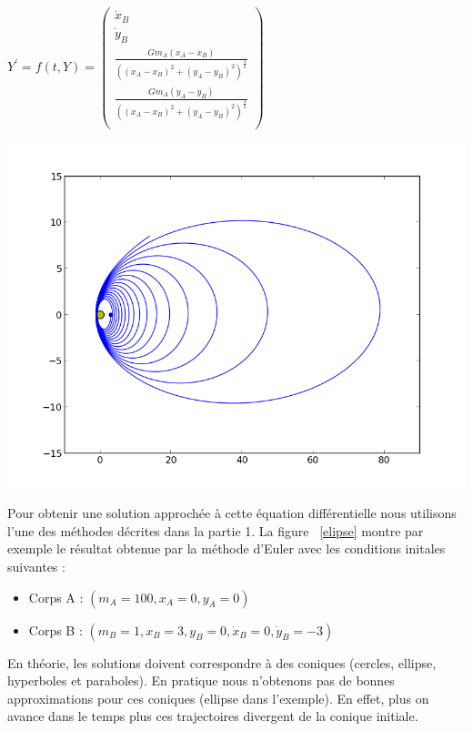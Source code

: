 \begin{center}
$Y^{'} = f(t,Y) = \begin{pmatrix}
  \dot x_{B} \\
  \dot y_{B} \\
   \frac{Gm_{A}(x_{A} - x_{B})}{((x_{A} - x_{B})^{2} + (y_{A} - y_{B})^{2})^{\frac{3}{2}}}\\
   \frac{Gm_{A}(y_{A} - y_{B})}{((x_{A} - x_{B})^{2} + (y_{A} - y_{B})^{2})^{\frac{3}{2}}}\\
\end{pmatrix}$
\end{center}
\begin{minipage}{0.4\textwidth}
\includegraphics[scale = 0.4]{elipsoide.png}
\label{elipse}
\end{minipage} \hfill
\begin{minipage}{0.45\textwidth}
Pour obtenir une solution approchée à cette équation différentielle nous utilisons l'une des méthodes décrites dans la partie 1. La figure ~\ref{elipse} montre par exemple le résultat obtenue par la méthode d'Euler avec les conditions initales suivantes :
\begin{itemize}
\item Corps A : $(m_{A} = 100, x_{A} = 0, y_{A} = 0)$
\item Corps B : $(m_{B} = 1, x_{B} = 3, y_{B} = 0, \dot x_{B} = 0, \dot y_{B} = -3)$
\end{itemize}
En théorie, les solutions doivent correspondre à des coniques (cercles, ellipse, hyperboles et paraboles). En pratique nous n'obtenons pas de bonnes approximations pour ces coniques (ellipse dans l'exemple). En effet, plus on avance dans le temps plus ces trajectoires divergent de la conique initiale.
\end{minipage}



